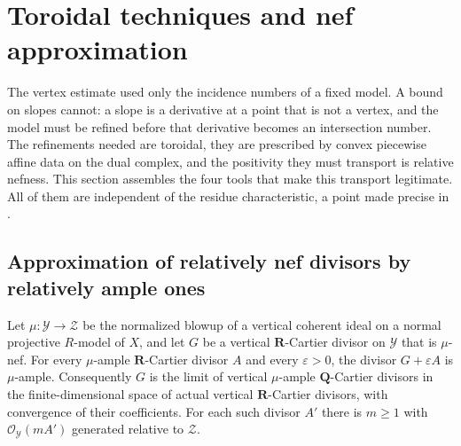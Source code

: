 \section{Toroidal techniques and nef approximation}
\label{sec:ch22-toroidal}

The vertex estimate used only the incidence numbers of a fixed model.  A
bound on slopes cannot: a slope is a derivative at a point that is not a
vertex, and the model must be refined before that derivative becomes an
intersection number.  The refinements needed are toroidal, they are
prescribed by convex piecewise affine data on the dual complex, and the
positivity they must transport is relative nefness.  This section assembles
the four tools that make this transport legitimate.  All of them are
independent of the residue characteristic, a point made precise in
.

\subsection{Approximation of relatively nef divisors by relatively ample ones}

\begin{lemma}
\label{lem:ch22-nef-approximation}
Let $\mu:\mathcal Y\to\mathcal Z$ be the normalized blowup of a vertical
coherent ideal on a normal projective $R$-model of $X$, and let $G$ be a
vertical $\mathbf R$-Cartier divisor on $\mathcal Y$ that is $\mu$-nef.  For
every $\mu$-ample $\mathbf R$-Cartier divisor $A$ and every
$\varepsilon>0$, the divisor $G+\varepsilon A$ is $\mu$-ample.
Consequently $G$ is the limit of vertical $\mu$-ample
$\mathbf Q$-Cartier divisors in the finite-dimensional space of actual
vertical $\mathbf R$-Cartier divisors, with convergence of their
coefficients.  For each such divisor $A'$ there is $m\geq1$ with
$\mathcal O_{\mathcal Y}(mA')$ generated relative to $\mathcal Z$.
\end{lemma}

